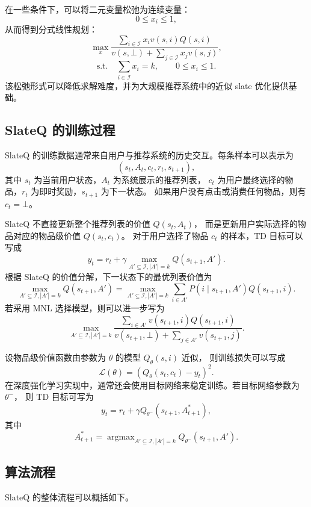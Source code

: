 \documentclass[11pt]{ctexart}
\begin{document}
在一些条件下，可以将二元变量松弛为连续变量：
\[
0\le x_i\le 1,
\]
从而得到分式线性规划：
\[
\max_{x}
\frac{
\sum_{i\in\mathcal{I}}x_i v(s,i)Q(s,i)
}{
v(s,\bot)+\sum_{j\in\mathcal{I}}x_j v(s,j)
},
\]
\[
\text{s.t.}
\quad
\sum_{i\in\mathcal{I}}x_i=k,
\qquad
0\le x_i\le 1.
\]
该松弛形式可以降低求解难度，并为大规模推荐系统中的近似 slate 优化提供基础。

\subsection{SlateQ 的训练过程}

SlateQ 的训练数据通常来自用户与推荐系统的历史交互。每条样本可以表示为
\[
(s_t,A_t,c_t,r_t,s_{t+1}),
\]
其中 $s_t$ 为当前用户状态，$A_t$ 为系统展示的推荐列表，
$c_t$ 为用户最终选择的物品，$r_t$ 为即时奖励，$s_{t+1}$ 为下一状态。
如果用户没有点击或消费任何物品，则有 $c_t=\bot$。

SlateQ 不直接更新整个推荐列表的价值 $Q(s_t,A_t)$，
而是更新用户实际选择的物品对应的物品级价值 $Q(s_t,c_t)$。
对于用户选择了物品 $c_t$ 的样本，TD 目标可以写成
\[
y_t
=
r_t
+
\gamma
\max_{A'\subseteq \mathcal{I}, |A'|=k}
Q(s_{t+1},A').
\]
根据 SlateQ 的价值分解，下一状态下的最优列表价值为
\[
\max_{A'\subseteq \mathcal{I}, |A'|=k}
Q(s_{t+1},A')
=
\max_{A'\subseteq \mathcal{I}, |A'|=k}
\sum_{i\in A'}
P(i\mid s_{t+1},A')Q(s_{t+1},i).
\]
若采用 MNL 选择模型，则可以进一步写为
\[
\max_{A'\subseteq \mathcal{I}, |A'|=k}
\frac{
\sum_{i\in A'}v(s_{t+1},i)Q(s_{t+1},i)
}{
v(s_{t+1},\bot)+\sum_{j\in A'}v(s_{t+1},j)
}.
\]

设物品级价值函数由参数为 $\theta$ 的模型 $Q_{\theta}(s,i)$ 近似，
则训练损失可以写成
\[
\mathcal{L}(\theta)
=
\left(
Q_{\theta}(s_t,c_t)-y_t
\right)^2.
\]
在深度强化学习实现中，通常还会使用目标网络来稳定训练。若目标网络参数为 $\theta^{-}$，
则 TD 目标可写为
\[
y_t
=
r_t
+
\gamma
Q_{\theta^{-}}(s_{t+1},A_{t+1}^{*}),
\]
其中
\[
A_{t+1}^{*}
=
\mathop{\arg\max}_{A'\subseteq \mathcal{I}, |A'|=k}
Q_{\theta^{-}}(s_{t+1},A').
\]

\subsection{算法流程}

SlateQ 的整体流程可以概括如下。
\end{document}
